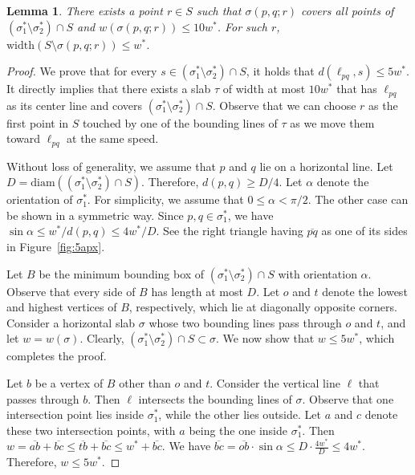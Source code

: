 \documentclass[10pt,a4paper]{article}
\newtheorem{lemma}[theorem]{Lemma}
\theoremstyle{star}
\theoremstyle{claimstar}
\newcommand{\diam}{\ensuremath{\mathrm{diam}}}
\newcommand{\width}{\ensuremath{\mathrm{width}}}
\begin{document}
\begin{lemma}
    There exists a point $r\in S$ such that $\sigma(p, q;r)$ covers all points of $(\sigma_1^*\setminus \sigma_2^* ) \cap S $ and $w(\sigma(p, q;r)) \le 10 w^*$. 
    For such $r$, $\width(S \setminus \sigma(p, q; r))\le w^*$.
    \label{lem:10apx_existence}
\end{lemma}


\begin{proof}
    We prove that for every $s\in (\sigma_1^* \setminus \sigma_2^*)\cap S$, it holds that $d(\ell_{pq}, s) \le 5w^*$. It directly implies that there exists a slab $\tau$ of width at most $10w^*$ that has $\ell_{pq}$ as its center line and covers $(\sigma_1^*\setminus \sigma_2^* ) \cap S$. 
    Observe that we can choose $r$ as the first point in $S$ touched by one of the bounding lines of $\tau$ as we move them toward $\ell_{pq}$ at the same speed.

    Without loss of generality, we assume that $p$ and $q$ lie on a horizontal line. 
    Let $D = \diam((\sigma_1^* \setminus \sigma_2^*) \cap S)$. 
    Therefore, $d(p, q) \ge D/4$. 
    Let $\alpha$ denote the orientation of $\sigma_1^*$. 
    For simplicity, we assume that $0\le \alpha < \pi/2$. The other case can be shown in a symmetric way. 
    Since $p, q \in \sigma_1^*$, we have $\sin \alpha \le w^*/ d(p, q) \le  4w^*/D$. See the right triangle having $\overline{pq}$ as one of its sides in Figure~\ref{fig:5apx}.
    
    Let $B$ be the minimum bounding box of $(\sigma_1^* \setminus \sigma_2^*) \cap S$ with orientation $\alpha$.
    Observe that every side of $B$ has length at most $D$. 
    Let $o$ and $t$ denote the lowest and highest vertices of $B$, respectively, which lie at diagonally opposite corners.
    Consider a horizontal slab $\sigma$ whose two bounding lines pass through $o$ and $t$, and let $w = w(\sigma)$.  
    Clearly, $(\sigma_1^* \setminus \sigma_2^*) \cap S \subset \sigma$. 
    We now show that $w \le 5w^*$, which completes the proof.

    Let $b$ be a vertex of $B$ other than $o$ and $t$. 
    Consider the vertical line $\ell$ that passes through $b$. Then $\ell$ intersects the bounding lines of $\sigma$. 
    Observe that one intersection point lies inside $\sigma_1^*$, while the other lies outside. 
    Let $a$ and $c$ denote these two intersection points, with $a$ being the one inside $\sigma_1^*$. 
    Then $w = \overline{ab} + \overline{bc} \le \overline{tb} + \overline{bc} \le w^* + \overline{bc}$.
     We have $\overline{bc} = \overline{ob}\cdot \sin \alpha 
    \le D \cdot \frac{4w^*}{D} \le 4w^*$.
    Therefore, $w \le 5w^*$. 
\end{proof}
\end{document}

